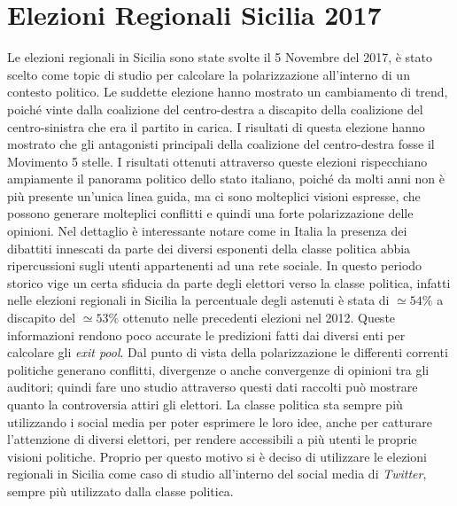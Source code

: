 \section{Elezioni Regionali Sicilia 2017}
\label{EleSicilia}
Le elezioni regionali in Sicilia sono state svolte il 5 Novembre del 2017, è stato scelto come topic di studio per calcolare la polarizzazione all'interno di un contesto politico. Le suddette elezione hanno mostrato un cambiamento di trend, poiché vinte dalla coalizione del centro-destra a discapito della coalizione del centro-sinistra che era il partito in carica. I risultati di questa elezione hanno mostrato che gli antagonisti principali della coalizione del centro-destra fosse il Movimento 5 stelle.
I risultati ottenuti attraverso queste elezioni rispecchiano ampiamente il panorama politico dello stato italiano, poiché da molti anni non è più presente un'unica linea guida, ma ci sono molteplici visioni espresse, che possono generare molteplici conflitti e quindi una forte polarizzazione delle opinioni. Nel dettaglio è interessante notare come in Italia la presenza dei dibattiti innescati da parte dei diversi esponenti della classe politica abbia ripercussioni sugli utenti appartenenti ad una rete sociale.
In questo periodo storico vige un certa sfiducia da parte degli elettori verso la classe politica, infatti nelle elezioni regionali in Sicilia la percentuale degli astenuti è stata di $\simeq 54\%$ a discapito del $\simeq 53\%$ ottenuto nelle precedenti elezioni nel 2012. Queste informazioni rendono poco accurate le predizioni fatti dai diversi enti per calcolare gli \textit{exit pool}.
Dal punto di vista della polarizzazione le differenti correnti politiche generano conflitti, divergenze o anche convergenze di opinioni tra gli auditori; quindi fare uno studio attraverso questi dati raccolti può mostrare quanto la controversia attiri gli elettori.
La classe politica sta sempre più utilizzando i social media per poter esprimere le loro idee, anche per catturare l'attenzione di diversi elettori, per rendere accessibili a più utenti le proprie visioni politiche. 
Proprio per questo motivo si è deciso di utilizzare le elezioni regionali in Sicilia come caso di studio all'interno del social media di \textit{Twitter}, sempre più utilizzato dalla classe politica.

